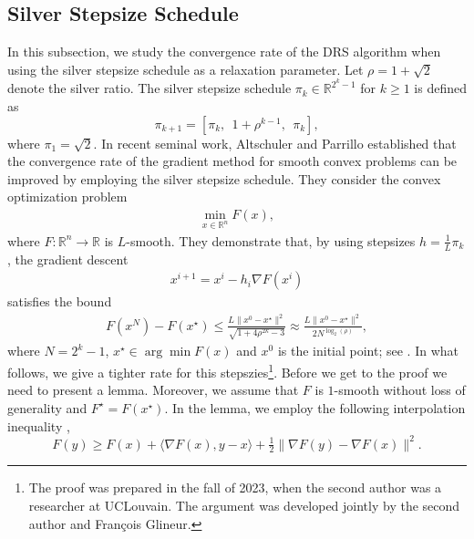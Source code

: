 \documentclass[ijoc,sglanonrev]{informs4}
\begin{document}
\subsection{Silver Stepsize Schedule}
In this subsection, we study the convergence rate of the DRS algorithm when using the silver stepsize schedule as a relaxation parameter. 
Let $\rho=1+\sqrt{2}$ denote the silver ratio. The silver stepsize schedule $\pi_k\in\mathbb{R}^{2^k-1}$ for $k\geq 1$ is defined as
$$
\pi_{k+1}=[\pi_{k}, \ \ 1+\rho^{k-1}, \ \ \pi_{k}],
$$
where $\pi_1=\sqrt{2}$.
In recent seminal work, Altschuler and Parrillo \cite{altschuler2024acceleration, altschuler2025acceleration} established that the convergence rate of the gradient method for smooth convex problems can be  improved by employing the silver stepsize schedule. They consider the convex optimization problem
\begin{align}\label{P_P}
\min_{x \in \mathbb{R}^n} F(x),
\end{align}
where $F:\mathbb{R}^n \to \mathbb{R}$ is $L$-smooth. They demonstrate that, by using stepsizes  $h = \frac{1}{L} \pi_k$, the gradient descent
\begin{align}\tag{GD}\label{GD}
  x^{i+1} = x^i - h_i\nabla F(x^i)  
\end{align}
satisfies the bound
\begin{align}
F(x^N) - F(x^\star) \leq \frac{L \|x^0 - x^\star\|^2}{\sqrt{1 + 4 \rho^{2k} - 3}}\approx  \frac{L \|x^0 - x^\star\|^2}{2 N^{\log_2{(\rho)}}},
\end{align}
where $N=2^k-1$, $x^\star \in \arg\min F(x)$ and $x^0$ is the initial point; see \cite[Theorem 1]{altschuler2024acceleration}. In what follows, we give a tighter rate for this stepszies\footnote{The proof was prepared in the fall of 2023, when the second author was a researcher at UCLouvain. The argument was developed jointly by the second author and François Glineur.}. 
Before we get to the proof we need to present a lemma. Moreover, we assume that $F$ is $1$-smooth without loss of generality and $F^\star=F(x^\star)$. In the lemma, we employ the following interpolation inequality  \cite[Theorem 2.1.5]{nesterov2018lectures},
$$
F(y)\geq F(x)+\langle \nabla F(x), y-x\rangle+\tfrac{1}{2}\|\nabla F(y)-\nabla F(x)\|^2.
$$
\end{document}
